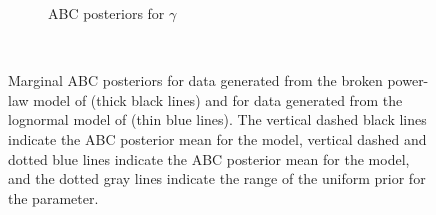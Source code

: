 \documentclass[ejs]{imsart}
\numberwithin{equation}{section}
\theoremstyle{plain}
\begin{document}
\begin{figure}[htbp]
\begin{subfigure}{0.32\textwidth}
\caption{ABC posteriors for $\gamma$}\label{subfig:kc_gamma}
\end{subfigure} \\
\caption{Marginal ABC posteriors for data generated from the broken power-law model of \cite{kroupa2001} (thick black lines)
and for data generated from the lognormal model of \cite{Chabrier:2003oq, Chabrier:2003om} (thin blue lines).  The vertical dashed black lines indicate the ABC posterior mean for the \cite{kroupa2001} model, vertical dashed and dotted blue lines indicate the ABC posterior mean for the \cite{Chabrier:2003oq, Chabrier:2003om} model, and the dotted gray lines indicate the range of the uniform prior for the parameter.  
 }
\label{fig:kroupa_chab_marginals}
\end{figure}
\end{document}
